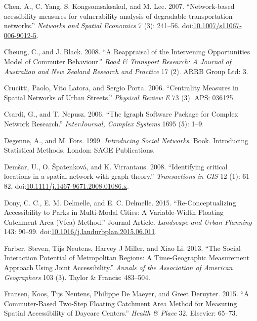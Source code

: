 \documentclass[]{elsarticle} %
\begin{document}
\hypertarget{ref-Chen2007}{}
Chen, A., C. Yang, S. Kongsomsaksakul, and M. Lee. 2007. ``Network-based
acessibility measures for vulnerability analysis of degradable
transportation networks.'' \emph{Networks and Spatial Economics} 7 (3):
241--56.
doi:\href{https://doi.org/10.1007/s11067-006-9012-5}{10.1007/s11067-006-9012-5}.

\hypertarget{ref-Cheung2008}{}
Cheung, C., and J. Black. 2008. ``A Reappraisal of the Intervening
Opportunities Model of Commuter Behaviour.'' \emph{Road \& Transport
Research: A Journal of Australian and New Zealand Research and Practice}
17 (2). ARRB Group Ltd: 3.

\hypertarget{ref-crucitti2006centrality}{}
Crucitti, Paolo, Vito Latora, and Sergio Porta. 2006. ``Centrality
Measures in Spatial Networks of Urban Streets.'' \emph{Physical Review
E} 73 (3). APS: 036125.

\hypertarget{ref-igraph}{}
Csardi, G., and T. Nepusz. 2006. ``The Igraph Software Package for
Complex Network Research.'' \emph{InterJournal, Complex Systems} 1695
(5): 1--9.

\hypertarget{ref-Degenne1999}{}
Degenne, A., and M. Fors. 1999. \emph{Introducing Social Networks}.
Book. Introducing Statistical Methods. London: SAGE Publications.

\hypertarget{ref-Demsar2008}{}
Demšar, U., O. Špatenková, and K. Virrantaus. 2008. ``Identifying
critical locations in a spatial network with graph theory.''
\emph{Transactions in GIS} 12 (1): 61--82.
doi:\href{https://doi.org/10.1111/j.1467-9671.2008.01086.x}{10.1111/j.1467-9671.2008.01086.x}.

\hypertarget{ref-Dony2015}{}
Dony, C. C., E. M. Delmelle, and E. C. Delmelle. 2015.
``Re-Conceptualizing Accessibility to Parks in Multi-Modal Cities: A
Variable-Width Floating Catchment Area (Vfca) Method.'' Journal Article.
\emph{Landscape and Urban Planning} 143: 90--99.
doi:\href{https://doi.org/10.1016/j.landurbplan.2015.06.011}{10.1016/j.landurbplan.2015.06.011}.

\hypertarget{ref-farber2013social}{}
Farber, Steven, Tijs Neutens, Harvey J Miller, and Xiao Li. 2013. ``The
Social Interaction Potential of Metropolitan Regions: A Time-Geographic
Measurement Approach Using Joint Accessibility.'' \emph{Annals of the
Association of American Geographers} 103 (3). Taylor \& Francis:
483--504.

\hypertarget{ref-fransen2015commuter}{}
Fransen, Koos, Tijs Neutens, Philippe De Maeyer, and Greet Deruyter.
2015. ``A Commuter-Based Two-Step Floating Catchment Area Method for
Measuring Spatial Accessibility of Daycare Centers.'' \emph{Health \&
Place} 32. Elsevier: 65--73.
\end{document}
